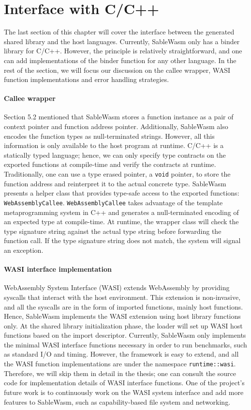 \section{Interface with C/C++}
The last section of this chapter will cover the interface between the generated
shared library and the host languages. Currently, SableWasm only has a binder
library for C/C++. However, the principle is relatively straightforward, and
one can add implementations of the binder function for any other language. In
the rest of the section, we will focus our discussion on the callee wrapper,
WASI function implementations and error handling strategies.

\paragraph{Callee wrapper}
Section 5.2 mentioned that SableWasm stores a function instance as a pair of
context pointer and function address pointer. Additionally, SableWasm also
encodes the function types as null-terminated strings. However, all this
information is only available to the host program at runtime. C/C++ is a
statically typed language; hence, we can only specify type contracts on the
exported functions at compile-time and verify the contracts at runtime.
Traditionally, one can use a type erased pointer, a \texttt{void} pointer,
to store the function address and reinterpret it to the actual concrete type.
SableWasm presents a helper class that provides type-safe access to the
exported functions: \texttt{WebAssemblyCallee}. \texttt{WebAssemblyCallee} takes
advantage of the template metaprogramming system in C++ and generates
a null-terminated encoding of an expected type at compile-time. At runtime,
the wrapper class will check the type signature string against the actual type
string before forwarding the function call. If the type signature string does
not match, the system will signal an exception.

\paragraph{WASI interface implementation}
WebAssembly System Interface (WASI) extends WebAssembly by providing syscalls
that interact with the host environment. This extension is non-invasive, and
all the syscalls are in the form of imported functions, mainly host
functions. Hence, SableWasm implements the WASI extension using host library
functions only. At the shared library initialization phase, the loader will set
up WASI host functions based on the import descriptor. Currently, SableWasm only
implements the minimal WASI interface functions necessary in order to run
benchmarks, such as standard I/O and timing. However, the framework is easy to
extend, and all the WASI function implementations are under the namespace
\texttt{runtime::wasi}. Therefore, we will skip them in detail in the thesis;
one can consult the source code for implementation details of WASI interface
functions. One of the project's future work is to continuously work on the
WASI system interface and add more features to SableWasm, such as
capability-based file system and networking.

